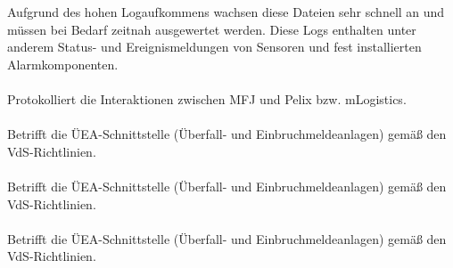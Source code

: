 Aufgrund des hohen Logaufkommens wachsen diese Dateien sehr schnell an und müssen bei Bedarf zeitnah ausgewertet werden.  
Diese Logs enthalten unter anderem Status- und Ereignismeldungen von Sensoren und fest installierten Alarmkomponenten.

\paragraph{\lomfjPelixLog}
Protokolliert die Interaktionen zwischen MFJ und Pelix bzw. mLogistics.

\paragraph{\lomfjUeaLog}
Betrifft die ÜEA-Schnittstelle (Überfall- und Einbruchmeldeanlagen) gemäß den VdS-Richtlinien.

\paragraph{\EMPerformance}
Betrifft die ÜEA-Schnittstelle (Überfall- und Einbruchmeldeanlagen) gemäß den VdS-Richtlinien.

\paragraph{\PelixPerformance}
Betrifft die ÜEA-Schnittstelle (Überfall- und Einbruchmeldeanlagen) gemäß den VdS-Richtlinien.
